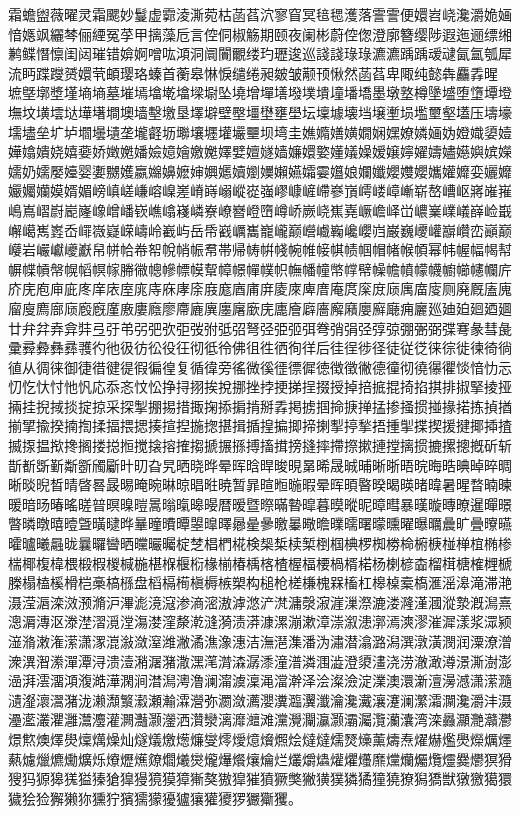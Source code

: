 霜蟾盥薇曜灵霜颸妙鬘虚霩淩澌菀枯菡萏泬寥窅冥毰毸濩落霅霅便嬛岧峣瀺灂姽婳愔嫕飒纚棽俪緸冤莩甲摛藻卮言倥侗椒觞期颐夜阑彬蔚倥偬澄廓簪缨陟遐迤逦缥缃鹣鲽憯懔闺闼璀错媕婀噌吰澒洞阛闠覼缕玓瓑逡巡諓諓琭琭瀌瀌踽踽叆叇氤氲瓠犀流眄蹀躞赟嬛茕頔璎珞螓首蘅皋惏悷缱绻昶皴皱颟顸愀然菡萏卑陬纯懿犇麤掱暒 墌墍墎墏墐墒墒墓墔墕墖墘墖墚墛坠墝增墠墡墢墣墤墥墦墧墨墩墪樽墬墭堕墯墰墱墲坟墴墵垯墷墸墹墺墙墼墽垦墿壀壁壂壃壄壅壆坛壈壉壊垱壌壍埙壏壐壑壒压壔壕壖壗垒圹垆壛壜壝垄壠壡坜壣壤壥壦壧壨坝塆圭嫶嫷嫸嫹嫺娴嫼嫽嫾婳妫嬁嬂嬃嬄嬅嬆嬇娆嬉嬊娇嬍嬎嬏嬐嬑嬒嬓嬔嬕嬖嬗嬘嫱嬚嬛嬜嬞嬟嬠嫒嬢嬣嬥嬦嬧嬨嬩嫔嬫嬬奶嬬嬮嬯婴嬱嬲嬳嬴嬵嬶嬷婶嬹嬺嬻嬼嬽嬾嬿孀孁孂娘孄孅孆孇孆孈孉孊娈孋孊孍孎孏嫫婿媚嵭嵮嵯嵰嵱嵲嵳嵴嵵嵶嵷嵸嵹嵺嵻嵼嵽嵾嵿嶀嵝嶂嶃崭嶅嶆岖嶈嶉嶊嶋嶌嶍嶎嶏嶐嶑嶒嶓嵚嶕嶖嶘嶙嶚嶛嶜嶝嶞嶟峤嶡峣嶣嶤嶥嶦峄峃嶩嶪嶫嶬嶭崄嶯嶰嶱嶲嶳岙嶵嶶嶷嵘嶹岭嶻屿岳帋巀巁巂巃巄巅巆巇巈巉巊岿巌巍巎巏巐巑峦巓巅巕岩巗巘巙巚帠帡帢帣帤帨帩帪帬帯帰帱帲帴帵帷帹帺帻帼帽帾帿幁幂帏幄幅幆幇幈幉幊幋幌幍幎幏幐幑幒幓幖幙幚幛幜幝幞帜幠幡幢幤幥幦幧幨幩幪幭幮幯幰幱庍庎庑庖庘庛庝庠庡庢庣庤庥庨庩庪庬庮庯庰庱庲庳庴庵庹庺庻庼庽庿廀厕廃厩廅廆廇廋廌廍庼廏廐廑廒廔廕廖廗廘廙廛廜廞庑廤廥廦廧廨廭廮廯廰痈廲廵廸廹廻廼廽廿弁弅弆弇弉弖弙弚弜弝弞弡弢弣弤弨弩弪弫弬弭弮弰弲弪弴弶弸弻弼弽弿彖彗彘彚彛彜彝彞彟彴彵彶彷彸役彺彻彽彾佛徂徃徆徇徉后徍徎徏径徒従徔徕徖徙徚徛徜徝从徟徕御徢徣徤徥徦徧徨复循徫旁徭微徯徰徱徲徳徴徵徶德徸彻徺忁忂惔愔忇忈忉忔忕忖忚忛応忝忞忟忪挣挦挧挨挩挪挫挬挭挮挰掇授掉掊掋掍掎掐掑排掓掔掕挜掚挂掜掝掞掟掠采探掣掤掦措掫掬掭掮掯掰掱掲掳掴掵掶掸掹掺掻掼掽掾掿拣揁揂揃揅揄揆揇揈揉揊揋揌揍揎揑揓揔揕揖揗揘揙揤揥揦揧揨揫捂揰揱揲揳援揵揶揷揸揻揼揾揿搀搁搂搃搄搅搇搈搉搊搋搌搎搏搐搑搒摓摔摕摖摗摙摚摛掼摝摞摠摡斫斩斮斱斲斳斴斵斶斸旪旫旮旯晒晓晔晕晖晗晘晙晛晜晞晟晠晡晰晣晤晥晦晧晪晫晬晭晰晱晲晳晴晵晷晸晹晻晼晽晾晿暀暁暂暃暄暅暆暇晕晖暊暋暌暍暎暏暐暑暒暓暔暕暖暗旸暙暚暛暜暝暞暟暠暡暣暤暥暦暧暨暩暪暬暭暮暯暰昵暲暳暴暵暶暷暸暹暺暻暼暽暾暿曀曁曂曃晔曅曈曊曋曌曍曎曏曐曑曒曓曔曕曗曘曙曚曛曜曝曞曟旷曡曢曣曤曥曦曧昽曩曪曫晒曭曮曯椗椘椙椚椛検椝椞椟椠椡椢椣椤椥椦椧椨椩椪椫椬椭椮椯椰椱椲椳椴椵椶椷椸椹椺椻椼椽椾椿楀楁楂楃楅楆楇楈楉杨楋楌楍榴榵榶榷榸榹榺榻榼榽榾桤槀槁槂盘槄槅槆槇槈槉槊构槌枪槎槏槐槑槒杠槔槕槖槗滙滛滜滝滞滟滠滢滣滦滧滪滫沪滭滮滰滱渗滳滵滶滹滺浐滼滽漀漃漄漅漈漉溇漋漌漍漎漐漑澙熹漗漘漙沤漛漜漝漞漟漡漤漥漦漧漨漪渍漭漮漯漰漱漳漴溆漶漷漹漺漻漼漽漾浆潀颍潂潃潄潅潆潇潈潉潊潋潌潍潎潏潐潒潓洁潕潖潗潘沩潚潜潝潞潟潠潡潢潣润潥潦潧潨潩潪潫潬潭浔溃潱潲潳潴潵潶滗潸潹潺潻潼潽潾涠澁澄澃澅浇涝澈澉澊澋澌澍澎澏湃澐澑澒澓澔澕澖涧澘澙澚澛澜澝澞澟渑澢澣泽浍澯澰淀澲澳澴澵澶澷澸潇潆瀡瀢瀣瀤瀥潴泷濑瀩瀪瀫瀬瀭瀮瀯弥瀱潋瀳瀴瀵瀶瀷瀸瀹瀺瀻瀼瀽澜瀿灀灁瀺灂沣滠灅灆灇灈灉灊灋灌灍灎灏灐洒灒灓漓灖灗滩灙灚灛灜灏灞灟灠灡灢湾滦灥灦灧灨灪燝燞燠燡燢燣燤燥灿燧燨燩燪燫燮燯燰燱燲燳烩燵燵燸燹燺薰燽焘燿爀爁爂爃爄爅爇爈爉爊爋爌烁爎爏爑爒爓爔爕爖爗爘爙爚烂爜爝爞爟爠爡爢爣爤爥爦爧爨爩猽猾獀犸獂獆獇獈獉獊獋獌獍獏獐獑獒獓獔獕獖獗獘獙獚獛獜獝獞獟獠獡獢獣獤獥獦獧獩狯猃獬獭狝獯狞獱獳獴獶獹獽獾獿猡玁玂玃。
